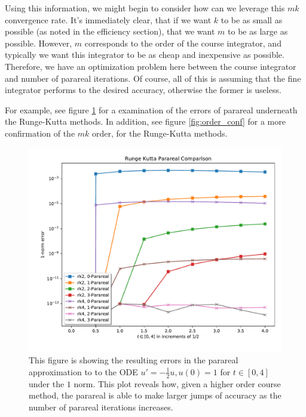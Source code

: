 Using this information, we might begin to consider how can we leverage this $mk$
convergence rate. It's immediately clear, that if we want $k$ to be as small as
possible (as noted in the efficiency section), that we want $m$ to be as large
as possible. However, $m$ corresponds to the order of the course integrator, and
typically we want this integrator to be as cheap and inexpensive as possible.
Therefore, we have an optimization problem here between the course integrator
and number of parareal iterations. Of course, all of this is assuming that the
fine integrator performs to the desired accuracy, otherwise the former is
useless. 

For example, see figure \ref{fig:conv_rk} for a examination of the errors of
parareal underneath the Runge-Kutta methods. In addition, see figure
\ref{fig:order_conf} for a more confirmation of the $mk$ order, for the
Runge-Kutta methods.

\begin{figure}[!htb]
  \centering
  \includegraphics[width=.85\textwidth]{./resources/runge_kutta_parareal}
  \caption{This figure is showing the resulting errors in the parareal
    approximation to to the ODE $u' = -\frac{1}{2}u, u(0) = 1$ for $t \in [0,
    4]$ under the $1$ norm. This plot reveals how, given a higher order course
    method, the parareal is able to make larger jumps of accuracy as the number
    of parareal iterations increases.}\label{fig:conv_rk}
\end{figure}

